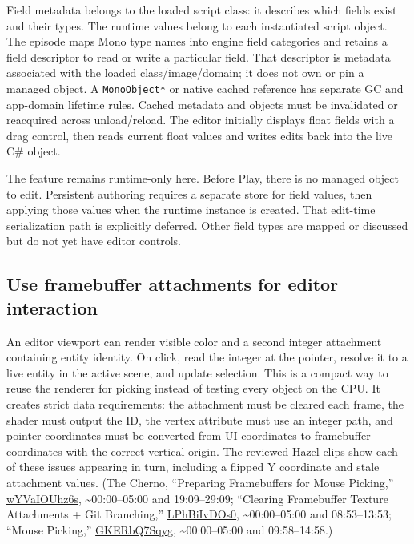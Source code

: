 Field metadata belongs to the loaded script class: it describes which fields exist and their types. The runtime values belong to each instantiated script object. The episode maps Mono type names into engine field categories and retains a field descriptor to read or write a particular field. That descriptor is metadata associated with the loaded class/image/domain; it does not own or pin a managed object. A \texttt{MonoObject*} or native cached reference has separate GC and app-domain lifetime rules. Cached metadata and objects must be invalidated or reacquired across unload/reload. The editor initially displays float fields with a drag control, then reads current float values and writes edits back into the live C\# object.

The feature remains runtime-only here. Before Play, there is no managed object to edit. Persistent authoring requires a separate store for field values, then applying those values when the runtime instance is created. That edit-time serialization path is explicitly deferred. Other field types are mapped or discussed but do not yet have editor controls.

\subsection{Use framebuffer attachments for editor interaction}\label{06-engine-ii-ch032-use-framebuffer-attachments-for-editor-interaction}

An editor viewport can render visible color and a second integer attachment containing entity identity. On click, read the integer at the pointer, resolve it to a live entity in the active scene, and update selection. This is a compact way to reuse the renderer for picking instead of testing every object on the CPU. It creates strict data requirements: the attachment must be cleared each frame, the shader must output the ID, the vertex attribute must use an integer path, and pointer coordinates must be converted from UI coordinates to framebuffer coordinates with the correct vertical origin. The reviewed Hazel clips show each of these issues appearing in turn, including a flipped Y coordinate and stale attachment values. (The Cherno, ``Preparing Framebuffers for Mouse Picking,'' \href{https://www.youtube.com/watch?v=wYVaIOUhz6s}{wYVaIOUhz6s}, \textasciitilde00:00--05:00 and 19:09--29:09; ``Clearing Framebuffer Texture Attachments + Git Branching,'' \href{https://www.youtube.com/watch?v=LPhBiIvDOs0}{LPhBiIvDOs0}, \textasciitilde00:00--05:00 and 08:53--13:53; ``Mouse Picking,'' \href{https://www.youtube.com/watch?v=GKERbQ7Sqyg}{GKERbQ7Sqyg}, \textasciitilde00:00--05:00 and 09:58--14:58.)

